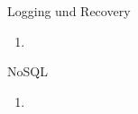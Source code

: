 \documentclass{article}
\begin{document}
\begin{exercise}{Logging und Recovery}
  \begin{enumerate}
    \item 
  \end{enumerate}

  \begin{solution}
  \end{solution}
\end{exercise}


\begin{exercise}{NoSQL}
  \begin{enumerate}
    \item 
  \end{enumerate}

  \begin{solution}
  \end{solution}
\end{exercise}
\end{document}
